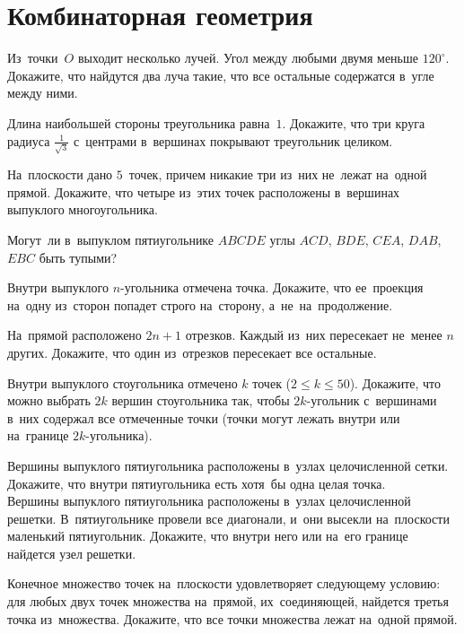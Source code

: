 
\section*{Комбинаторная геометрия}


\begin{problems}

\item
Из~точки~$O$ выходит несколько лучей.
Угол между любыми двумя меньше $120^{\circ}$.
Докажите, что найдутся два луча такие, что все остальные содержатся в~угле
между ними.

\item
Длина наибольшей стороны треугольника равна~$1$.
Докажите, что три круга радиуса $\frac{1}{\sqrt{3}}$ с~центрами в~вершинах
покрывают треугольник целиком.

\item
На~плоскости дано $5$~точек, причем никакие три из~них не~лежат на~одной
прямой.
Докажите, что четыре из~этих точек расположены в~вершинах выпуклого
многоугольника.

\item
Могут~ли в~выпуклом пятиугольнике $ABCDE$ углы $ACD$, $BDE$, $CEA$, $DAB$,
$EBC$ быть тупыми?

\item
Внутри выпуклого $n$-угольника отмечена точка.
Докажите, что ее~проекция на~одну из~сторон попадет строго на~сторону,
а~не~на~продолжение.


\item
На~прямой расположено $2 n + 1$ отрезков.
Каждый из~них пересекает не~менее $n$ других.
Докажите, что один из~отрезков пересекает все остальные.

\item
Внутри выпуклого стоугольника отмечено $k$ точек ($2 \leq k \leq 50$).
Докажите, что можно выбрать $2 k$ вершин стоугольника так, чтобы $2 k$-угольник
с~вершинами в~них содержал все отмеченные точки (точки могут лежать внутри или
на~границе $2 k$-угольника).

\item
\subproblem
Вершины выпуклого пятиугольника расположены в~узлах целочисленной сетки.
Докажите, что внутри пятиугольника есть хотя~бы одна целая точка.
\\
\subproblem
Вершины выпуклого пятиугольника расположены в~узлах целочисленной решетки.
В~пятиугольнике провели все диагонали, и~они высекли на~плоскости маленький
пятиугольник.
Докажите, что внутри него или на~его границе найдется узел решетки.

\item
Конечное множество точек на~плоскости удовлетворяет следующему условию: для
любых двух точек множества на~прямой, их~соединяющей, найдется третья точка
из~множества.
Докажите, что все точки множества лежат на~одной прямой.

\end{problems}


